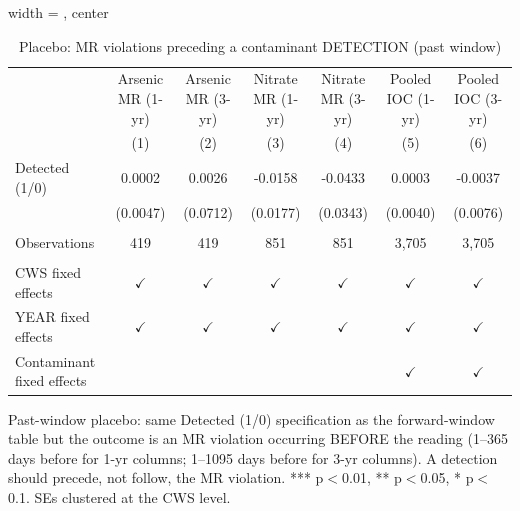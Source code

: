 
\begin{table}[htbp]
\caption{Placebo: MR violations preceding a contaminant DETECTION (past window)}\label{tab:mr_detection_lag_placebo}
\centering
\begin{adjustbox}{width = \textwidth, center}
   \begin{tabular}{lcccccc}
      \toprule    
                                       & Arsenic MR (1-yr) & Arsenic MR (3-yr)   & Nitrate MR (1-yr) & Nitrate MR (3-yr)   & Pooled IOC (1-yr)  & Pooled IOC (3-yr) \\   
                                       & (1)               & (2)                 & (3)               & (4)                 & (5)                & (6)\\  
      \midrule 
      Detected (1/0)                           & 0.0002            & 0.0026              & -0.0158           & -0.0433             & 0.0003             & -0.0037\\   
                                       & (0.0047)          & (0.0712)            & (0.0177)          & (0.0343)            & (0.0040)           & (0.0076)\\   
       \\
      Observations                     & 419               & 419                 & 851               & 851                 & 3,705              & 3,705\\  
       \\
      CWS fixed effects              & $\checkmark$      & $\checkmark$        & $\checkmark$      & $\checkmark$        & $\checkmark$       & $\checkmark$\\   
      YEAR fixed effects               & $\checkmark$      & $\checkmark$        & $\checkmark$      & $\checkmark$        & $\checkmark$       & $\checkmark$\\   
      Contaminant fixed effects  &                   &                     &                   &                     & $\checkmark$       & $\checkmark$\\   
      \bottomrule
   \end{tabular}
\end{adjustbox}
{\tiny\linespread{1}\selectfont \par \raggedright Past-window placebo: same Detected (1/0) specification as the forward-window table but the outcome is an MR violation occurring BEFORE the reading (1--365 days before for 1-yr columns; 1--1095 days before for 3-yr columns). A detection should precede, not follow, the MR violation. *** p$<$0.01, ** p$<$0.05, * p$<$0.1. SEs clustered at the CWS level.}
\end{table}
